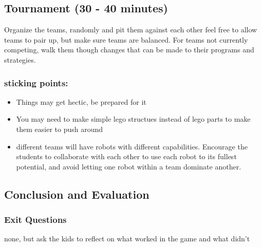 \documentclass{lessonplan}
\begin{document}
    \subsection{Tournament (30 - 40 minutes)}
      Organize the teams, randomly and pit them against each other
      feel free to allow teams to pair up, but make sure teams are
      balanced.  For teams not currently competing, walk them though
      changes that can be made to their programs and strategies.

      \subsubsection{sticking points:}
      \begin{itemize}
        \item Things may get hectic, be prepared for it
        \item You may need to make simple lego structues instead of
          lego parts to make them easier to push around
        \item different teams will have robots with different
          capabilities.  Encourage the students to collaborate with
          each other to use each robot to its fullest potential, and
          avoid letting one robot within a team dominate another.
      \end{itemize}

    \subsection{Conclusion and Evaluation}
      \subsubsection{Exit Questions}
        none, but ask the kids to reflect on what worked in the game and what didn't

    \appendix
\end{document}
